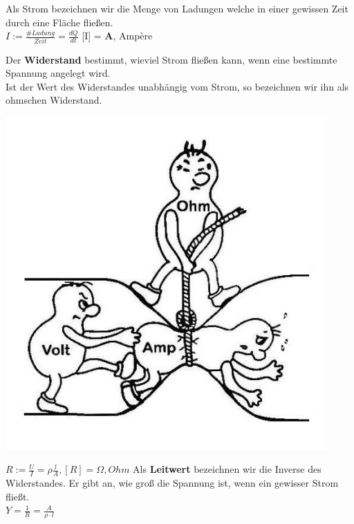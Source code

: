 
          \beginip
          Als Strom bezeichnen wir die Menge von Ladungen welche in einer gewissen Zeit durch eine Fläche fließen. \\

						\formulaBegin
						$ I := \frac{\texttt{\#}Ladung}{Zeit} = \frac{dQ}{dt}$
						{[I]} = \textbf{A}, Ampère
						\formulaEnd
					\iend

\newpage

          \beginip
					Der \textbf{Widerstand} bestimmt, wieviel Strom fließen kann, wenn eine bestimmte Spannung angelegt wird. \\
					Ist der Wert des Widerstandes unabhängig vom Strom, so bezeichnen wir ihn als ohmschen Widerstand.
					\begin{center}
						\includegraphics[scale=0.25]{img/widerstand.png}
					\end{center}
					\formulaBegin
					$ R :=  \frac{U}{I} =  \rho  \frac{l}{A},   {[R]} = \Omega, Ohm $
					\formulaEnd
					Als \textbf{Leitwert} bezeichnen wir die Inverse des Widerstandes. Er gibt an, wie groß die Spannung ist, wenn ein gewisser Strom fließt. \\
					\formulaBegin
					$ Y = \frac{1}{R} = \frac{A}{\rho \cdot l} $
					\formulaEnd
					\iend

